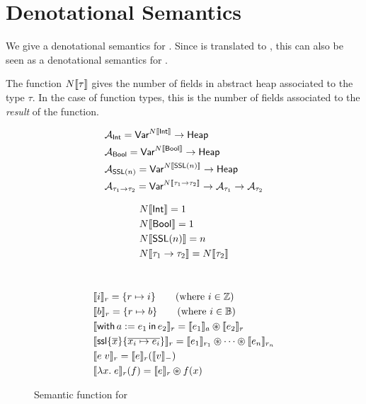 \section{Denotational Semantics}

We give a denotational semantics for \PikaCore. Since \Pika{} is translated to \PikaCore, this can
also be seen as a denotational semantics for \Pika.

The function $N\llbracket \tau \rrbracket$ gives the number of fields in abstract
heap associated to the type $\tau$. In the case of function types, this
is the number of fields associated to the \textit{result} of the function.

\begin{align*}
  &\mathcal{A}_{\textsf{Int}} = \textsf{Var}^{N\llbracket \textsf{Int} \rrbracket} \rightarrow \textsf{Heap}
  \\
  &\mathcal{A}_{\textsf{Bool}} = \textsf{Var}^{N\llbracket \textsf{Bool} \rrbracket} \rightarrow \textsf{Heap}
  \\
  &\mathcal{A}_{\textsf{SSL}(n)} = \textsf{Var}^{N\llbracket \textsf{SSL}(n) \rrbracket} \rightarrow \textsf{Heap}
  \\
  &\mathcal{A}_{\tau_1 \rightarrow \tau_2} = \textsf{Var}^{N\llbracket \tau_1 \rightarrow \tau_2 \rrbracket} \rightarrow \mathcal{A}_{\tau_1} \rightarrow \mathcal{A}_{\tau_2}
\end{align*}

\begin{align*}
  &N\llbracket \textsf{Int} \rrbracket = 1
  \\
  &N\llbracket \textsf{Bool} \rrbracket = 1
  \\
  &N\llbracket \textsf{SSL}(n) \rrbracket = n
  \\
  &N\llbracket \tau_1 \rightarrow \tau_2 \rrbracket = N\llbracket \tau_2 \rrbracket
\end{align*}
\\

\begin{figure}
\begin{center}
\end{center}
\begin{align*}
  &\sem{i}_r = \{ r \mapsto i \}\tag{where $i \in \mathbb{Z}$}
  \\
  &\sem{b}_r = \{ r \mapsto b \}\tag{where $i \in \mathbb{B}$}
  \\
  &\sem{\withIn{a := e_1} e_2}_r = \sem{e_1}_a \osep \sem{e_2}_r
  \\
  &\sem{\ssl{\overline{x}}\{\overline{x_i \mapsto e_i}\}}_r =
    \sem{e_1}_{r_1} \osep \cdots \osep \sem{e_n}_{r_n}
  \\
  &\sem{e\; v}_r =
      \sem{e}_r(\sem{v}_{-})
  \\
  &\sem{\lambda x.\; e}_r(f)
      = \sem{e}_r \osep f(x)
\end{align*}
  \caption{Semantic function for \PikaCore}
\end{figure}

